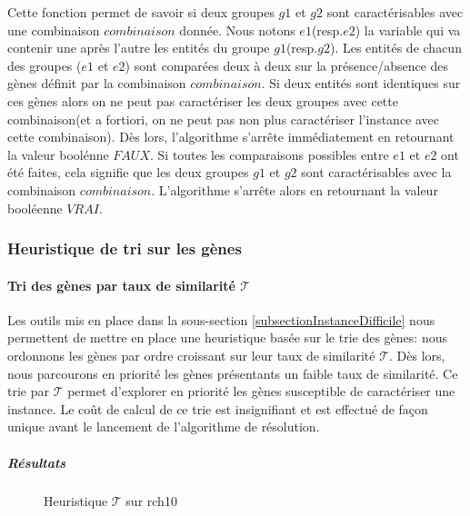 Cette fonction permet de savoir si deux groupes $g1$ et $g2$ sont caractérisables avec une combinaison $combinaison$ donnée. Nous notons $e1$(resp.$e2$) la variable qui va contenir une après l'autre les entités du groupe $g1$(resp.$g2$). Les entités de chacun des groupes ($e1$ et $e2$) sont comparées deux à deux sur la présence/absence des gènes définit par la combinaison $combinaison$. Si deux entités sont identiques sur ces gènes alors on ne peut pas caractériser les deux groupes avec cette combinaison(et a fortiori, on ne peut pas non plus caractériser l'instance avec cette combinaison). Dès lors, l'algorithme s'arrête immédiatement en retournant la valeur boolénne $FAUX$. Si toutes les comparaisons possibles entre $e1$ et $e2$ ont été faites, cela signifie que les deux groupes $g1$ et $g2$ sont caractérisables avec la combinaison $combinaison$. L'algorithme s'arrête alors en retournant la valeur booléenne $VRAI$.



\subsubsection{Heuristique de tri sur les gènes }
\paragraph{Tri des gènes par taux de similarité $\mathcal{T}$}
Les outils mis en place dans la sous-section \ref{subsectionInstanceDifficile} nous permettent de mettre en place une heuristique basée sur le trie des gènes: nous ordonnons les gènes par ordre croissant sur leur taux de similarité $\mathcal{T}$. Dès lors, nous parcourons en priorité les gènes présentants un faible taux de similarité. Ce trie par $\mathcal{T}$ permet d'explorer en priorité les gènes susceptible de caractériser une instance. Le coût de calcul de ce trie est insignifiant et est effectué de façon unique avant le lancement de l'algorithme de résolution.

\subparagraph{Résultats}

\begin{figure}
\centering
	\begin{minipage}[c]{0.49\linewidth}
	\centering
	
	\end{minipage}
	\begin{minipage}[c]{0.49\linewidth}
	\centering
	
	\end{minipage}
\caption{Heuristique $\mathcal{T}$ sur rch10}
\label{tauRch10}
\end{figure}

